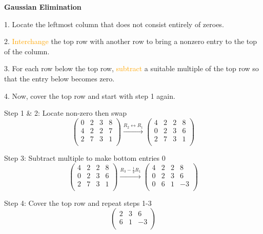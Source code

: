 \documentclass{article}
\begin{document}
\textbf{Gaussian Elimination}

1. Locate the leftmost column that does not consist entirely of zeroes.

2. \textcolor{orange}{Interchange} the top row with another row to bring a nonzero entry to the top of the column.


3. For each row below the top row, \textcolor{orange}{subtract} a suitable multiple of the top row so that the entry below becomes zero.

4. Now, cover the top row and start with step 1 again.


\vspace{10pt}

Step 1 \& 2: Locate non-zero then swap
\[
\left(
\begin{array}{ccc|c}
0 & 2 & 3 & 8 \\
4 & 2 & 2 & 7 \\
2 & 7 & 3 & 1 \\
\end{array}
\right)
\xrightarrow{\text{$R_2 \leftrightarrow R_1$}} 
\left(
\begin{array}{ccc|c}
4 & 2 & 2 & 8 \\
0 & 2 & 3 & 6 \\
2 & 7 & 3 & 1 \\
\end{array}
\right)
\]

\vspace{10pt}

Step 3: Subtract multiple to make bottom entries 0
\[
\left(
\begin{array}{ccc|c}
    4 & 2 & 2 & 8 \\
    0 & 2 & 3 & 6 \\
    2 & 7 & 3 & 1 \\
\end{array}
\right)
\xrightarrow{\text{$R_3 - \frac{1}{2}R_1$}} 
\left(
\begin{array}{ccc|c}
4 & 2 & 2 & 8 \\
0 & 2 & 3 & 6 \\
0 & 6 & 1 & -3 \\
\end{array}
\right)
\]

Step 4: Cover the top row and repeat steps 1-3
\[
\left(
\begin{array}{cc|c}
2 & 3 & 6 \\
6 & 1 & -3 \\
\end{array}
\right)
\]
\end{document}
